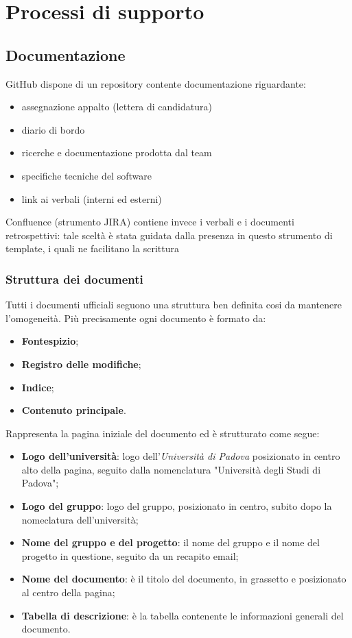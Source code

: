 \section{Processi di supporto}

\subsection{Documentazione}
GitHub dispone di un repository contente documentazione riguardante:
\begin{itemize}
    \item assegnazione appalto (lettera di candidatura)
    \item diario di bordo
    \item ricerche e documentazione prodotta dal team
    \item specifiche tecniche del software
    \item link ai verbali (interni ed esterni)
\end{itemize}
Confluence (strumento JIRA) contiene invece i verbali e i documenti retrospettivi: tale sceltà è stata guidata dalla presenza in questo strumento di template, i quali ne facilitano la scrittura

\subsubsection{Struttura dei documenti}
Tutti i documenti ufficiali seguono una struttura ben definita cosi da mantenere l'omogeneità. Più precisamente ogni documento è formato da:
\begin{itemize}
    \item \textbf{Fontespizio};
    \item \textbf{Registro delle modifiche};
    \item \textbf{Indice};
    \item \textbf{Contenuto principale}.
\end{itemize}
	
Rappresenta la pagina iniziale del documento ed è strutturato come segue:
\begin{itemize}
    \item \textbf{Logo dell'università}: logo dell'\textit{Università di Padova} posizionato in centro alto della pagina, seguito dalla nomenclatura "Università degli  Studi di Padova";
    \item \textbf{Logo del gruppo}: logo del gruppo, posizionato in centro, subito dopo la nomeclatura dell'università;
    \item \textbf{Nome del gruppo e del progetto}: il nome del gruppo e il nome del progetto in questione, seguito da un recapito email;
    \item \textbf{Nome del documento}: è il titolo del documento, in grassetto e posizionato al centro della pagina;
    \item \textbf{Tabella di descrizione}: è la tabella contenente le informazioni generali del documento.
\end{itemize}

